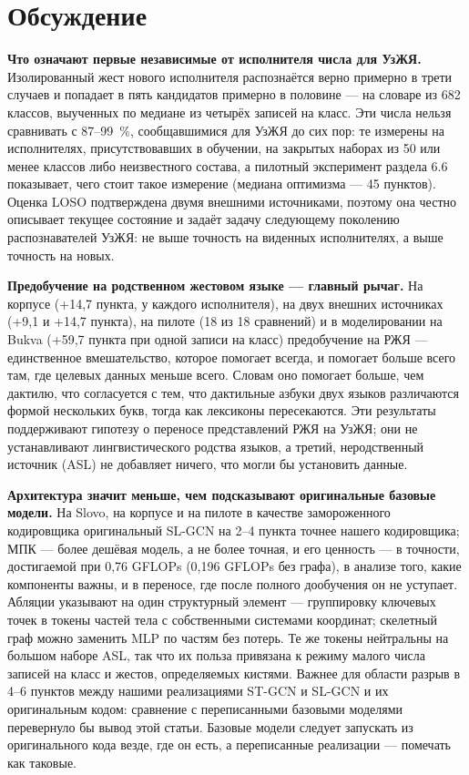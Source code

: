 \documentclass[a4paper,fleqn]{cas-dc}
\begin{document}
\hypertarget{ux43eux431ux441ux443ux436ux434ux435ux43dux438ux435}{%
\section{Обсуждение}\label{ux43eux431ux441ux443ux436ux434ux435ux43dux438ux435}}

\textbf{Что означают первые независимые от исполнителя числа для УзЖЯ.} Изолированный жест нового исполнителя распознаётся верно примерно в трети случаев и попадает в пять кандидатов примерно в половине --- на словаре из 682 классов, выученных по медиане из четырёх записей на класс. Эти числа нельзя сравнивать с 87--99~\%, сообщавшимися для УзЖЯ до сих пор: те измерены на исполнителях, присутствовавших в обучении, на закрытых наборах из 50 или менее классов либо неизвестного состава, а пилотный эксперимент раздела 6.6 показывает, чего стоит такое измерение (медиана оптимизма --- 45 пунктов). Оценка LOSO подтверждена двумя внешними источниками, поэтому она честно описывает текущее состояние и задаёт задачу следующему поколению распознавателей УзЖЯ: не выше точность на виденных исполнителях, а выше точность на новых.

\textbf{Предобучение на родственном жестовом языке --- главный рычаг.} На корпусе (+14,7 пункта, у каждого исполнителя), на двух внешних источниках (+9,1 и +14,7 пункта), на пилоте (18 из 18 сравнений) и в моделировании на Bukva (+59,7 пункта при одной записи на класс) предобучение на РЖЯ --- единственное вмешательство, которое помогает всегда, и помогает больше всего там, где целевых данных меньше всего. Словам оно помогает больше, чем дактилю, что согласуется с тем, что дактильные азбуки двух языков различаются формой нескольких букв, тогда как лексиконы пересекаются. Эти результаты поддерживают гипотезу о переносе представлений РЖЯ на УзЖЯ; они не устанавливают лингвистического родства языков, а третий, неродственный источник (ASL) не добавляет ничего, что могли бы установить данные.

\textbf{Архитектура значит меньше, чем подсказывают оригинальные базовые модели.} На Slovo, на корпусе и на пилоте в качестве замороженного кодировщика оригинальный SL-GCN на 2--4 пункта точнее нашего кодировщика; МПК --- более дешёвая модель, а не более точная, и его ценность --- в точности, достигаемой при 0,76 GFLOPs (0,196 GFLOPs без графа), в анализе того, какие компоненты важны, и в переносе, где после полного дообучения он не уступает. Абляции указывают на один структурный элемент --- группировку ключевых точек в токены частей тела с собственными системами координат; скелетный граф можно заменить MLP по частям без потерь. Те же токены нейтральны на большом наборе ASL, так что их польза привязана к режиму малого числа записей на класс и жестов, определяемых кистями. Важнее для области разрыв в 4--6 пунктов между нашими реализациями ST-GCN и SL-GCN и их оригинальным кодом: сравнение с переписанными базовыми моделями перевернуло бы вывод этой статьи. Базовые модели следует запускать из оригинального кода везде, где он есть, а переписанные реализации --- помечать как таковые.
\end{document}

